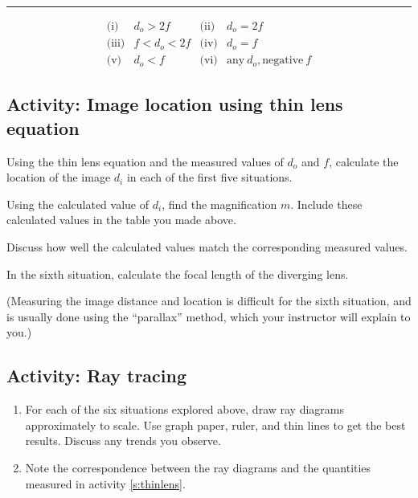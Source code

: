\begin{multicols}{2}
\hrule	
\begin{equation*}
\begin{array}{llll}
	\text{(i)}	& d_o > 2f		& \text{(ii)}	& d_o = 2f \\
	\text{(iii)}	& f < d_o < 2f	& \text{(iv)}	& d_o = f \\
	\text{(v)}	& d_o < f 		& \text{(vi)}	& \text{any}\  d_o, \text{negative}\  f
\end{array}
\end{equation*}
		
\subsection{Activity: Image location using thin lens equation}
\begin{enumerate}[leftmargin=*] 
	\item Using the thin lens equation and the measured values of $d_o$ and $f$, calculate the location of the image $d_i$ in each of the first five situations. 
	\item Using the calculated value of $d_i$, find the magnification $m$. Include these calculated values in the table you made above. 
	\item Discuss how well the calculated values match the corresponding measured values. 
	\item In the sixth situation, calculate the focal length of the diverging lens.
	{\item (Measuring the image distance and location is difficult for the sixth situation, and is usually done using the ``parallax'' method, which your instructor will explain to you.)}
\end{enumerate}

\subsection{Activity: Ray tracing}
\begin{enumerate}[leftmargin=*] 
	\item For each of the six situations explored above, draw ray diagrams approximately to scale. Use graph paper, ruler, and thin lines to get the best results. Discuss any trends you observe. 
	\item Note the correspondence between the ray diagrams and the quantities measured in activity \ref{s:thinlens}.
\end{enumerate}


\end{multicols}
